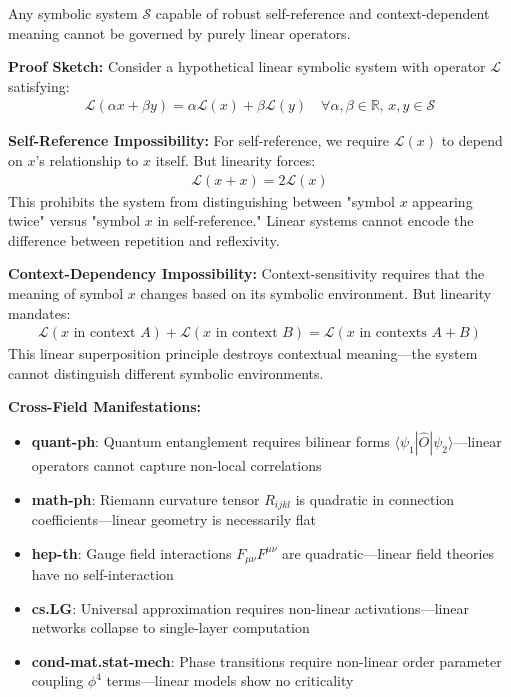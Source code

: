 \begin{theorem}
\label{theorem:reflexivity_quadratic}
Any symbolic system $\mathcal{S}$ capable of robust self-reference and context-dependent meaning cannot be governed by purely linear operators.

\textbf{Proof Sketch:}
Consider a hypothetical linear symbolic system with operator $\mathcal{L}$ satisfying:
\begin{align}
\mathcal{L}(\alpha x + \beta y) = \alpha \mathcal{L}(x) + \beta \mathcal{L}(y) \quad \forall \alpha, \beta \in \mathbb{R}, \, x, y \in \mathcal{S}
\end{align}

\textbf{Self-Reference Impossibility:} For self-reference, we require $\mathcal{L}(x)$ to depend on $x$'s relationship to $x$ itself. But linearity forces:
\begin{align}
\mathcal{L}(x + x) = 2\mathcal{L}(x)
\end{align}
This prohibits the system from distinguishing between "symbol $x$ appearing twice" versus "symbol $x$ in self-reference." Linear systems cannot encode the difference between repetition and reflexivity.

\textbf{Context-Dependency Impossibility:} Context-sensitivity requires that the meaning of symbol $x$ changes based on its symbolic environment. But linearity mandates:
\begin{align}
\mathcal{L}(x \text{ in context } A) + \mathcal{L}(x \text{ in context } B) = \mathcal{L}(x \text{ in contexts } A + B)
\end{align}
This linear superposition principle destroys contextual meaning—the system cannot distinguish different symbolic environments.

\textbf{Cross-Field Manifestations:}
\begin{itemize}
\item \textbf{quant-ph}: Quantum entanglement requires bilinear forms $\langle \psi_1 | \hat{O} | \psi_2 \rangle$—linear operators cannot capture non-local correlations
\item \textbf{math-ph}: Riemann curvature tensor $R_{ijkl}$ is quadratic in connection coefficients—linear geometry is necessarily flat
\item \textbf{hep-th}: Gauge field interactions $F_{\mu\nu} F^{\mu\nu}$ are quadratic—linear field theories have no self-interaction
\item \textbf{cs.LG}: Universal approximation requires non-linear activations—linear networks collapse to single-layer computation
\item \textbf{cond-mat.stat-mech}: Phase transitions require non-linear order parameter coupling $\phi^4$ terms—linear models show no criticality
\end{itemize}
\end{theorem}

